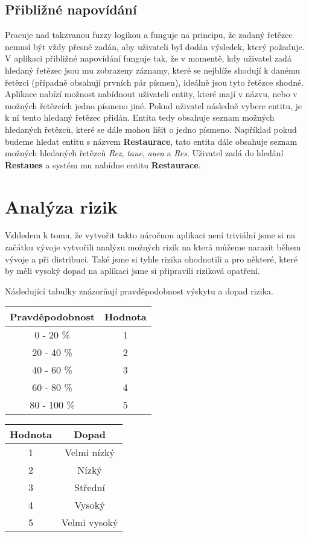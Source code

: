 \subsection{Přibližné napovídání}
\par Pracuje nad takzvanou fuzzy logikou a funguje na principu, že zadaný řetězec nemusí být vždy přesně zadán, aby uživateli byl dodán výsledek, který požaduje. V aplikaci přibližné napovídání funguje tak, že v momentě, kdy uživatel zadá hledaný řetězec jsou mu zobrazeny záznamy, které se nejblíže shodují k danému řetězci (případně obsahují prvních pár písmen), ideálně jsou tyto řetězce shodné. Aplikace nabízí možnost nabídnout uživateli entity, které mají v názvu, nebo v možných řetězcích jedno písmeno jiné. Pokud uživatel následně vybere entitu, je k ní tento hledaný řetězec přidán. Entita tedy obsahuje seznam možných hledaných řetězců, které se dále mohou lišit o jedno písmeno. Například pokud budeme hledat entitu s názvem \textbf{Restaurace}, tato entita dále obsahuje seznam možných hledaných řetězců \textit{Rez}, \textit{taue}, \textit{auea} a \textit{Res}. Uživatel zadá do hledání \textbf{Restaues} a systém mu nabídne entitu \textbf{Restaurace}.

\section{Analýza rizik}
\par Vzhledem k tomu, že vytvořit takto náročnou aplikaci není triviální jsme si na začátku vývoje vytvořili analýzu možných rizik na která můžeme narazit během vývoje a při distribuci. Také jsme si tyhle rizika ohodnotili a pro některé, které by měli vysoký dopad na aplikaci jsme si připravili riziková opatření.

\par Následující tabulky znázorňují pravděpodobnost výskytu a dopad rizika.

\begin{tabular}{|c | c |}
\hline
Pravděpodobnost&Hodnota\\
\hline
0 - 20 \%&1\\
\hline
20 - 40 \%&2\\
\hline
40 - 60 \%&3\\
\hline
60 - 80 \%&4\\
\hline
80 - 100 \%&5\\
\hline
\end{tabular}
\qquad\qquad\qquad\qquad
\begin{tabular}{|c | c |}
\hline
Hodnota&Dopad\\
\hline
1&Velmi nízký\\
\hline
2&Nízký\\
\hline
3&Střední\\
\hline
4&Vysoký\\
\hline
5&Velmi vysoký\\
\hline
\end{tabular}

